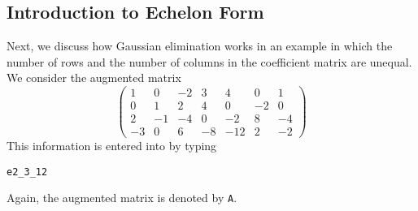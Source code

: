 \subsection*{Introduction to Echelon Form} 

Next, we discuss how Gaussian elimination works in an example
in which the number of rows and the number of columns in the
coefficient matrix are unequal.  We consider the augmented
matrix
\begin{equation*}  \label{examp5}
\left(
\begin{array}{rrrrrr|r}
 1  &  0  & -2  &  3  &  4  &  0  &  1\\
 0  &  1  &  2  &  4  &  0  & -2  &  0\\
 2  & -1  & -4  &  0  & -2  &  8  & -4\\
-3  &  0  &  6  & -8  &-12  &  2  & -2
\end{array}
\right)
\end{equation*}
This information is entered into \Matlab by typing
\begin{verbatim}
e2_3_12
\end{verbatim}
Again, the augmented matrix is denoted by {\tt A}.

